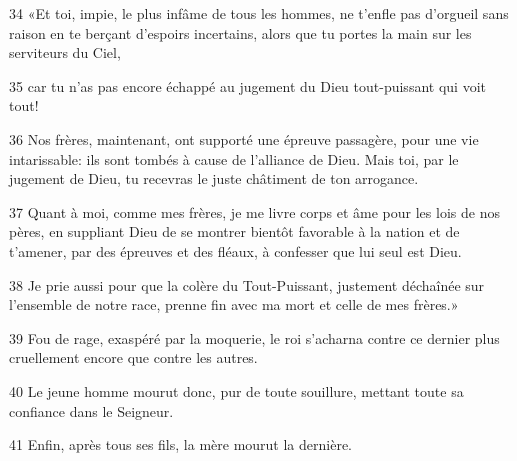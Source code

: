 
34 «Et toi, impie, le plus infâme de tous les hommes, ne t’enfle pas d’orgueil sans raison en te berçant d’espoirs incertains, alors que tu portes la main sur les serviteurs du Ciel,

35 car tu n’as pas encore échappé au jugement du Dieu tout-puissant qui voit tout!

36 Nos frères, maintenant, ont supporté une épreuve passagère, pour une vie intarissable: ils sont tombés à cause de l’alliance de Dieu. Mais toi, par le jugement de Dieu, tu recevras le juste châtiment de ton arrogance.

37 Quant à moi, comme mes frères, je me livre corps et âme pour les lois de nos pères, en suppliant Dieu de se montrer bientôt favorable à la nation et de t’amener, par des épreuves et des fléaux, à confesser que lui seul est Dieu.

38 Je prie aussi pour que la colère du Tout-Puissant, justement déchaînée sur l’ensemble de notre race, prenne fin avec ma mort et celle de mes frères.»

39 Fou de rage, exaspéré par la moquerie, le roi s’acharna contre ce dernier plus cruellement encore que contre les autres.

40 Le jeune homme mourut donc, pur de toute souillure, mettant toute sa confiance dans le Seigneur.

41 Enfin, après tous ses fils, la mère mourut la dernière.